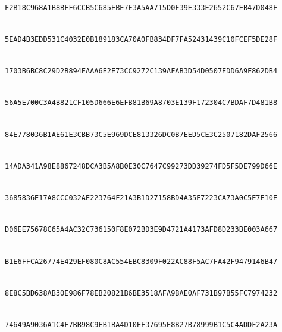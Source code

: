 \smallskip
\noindent{}\\
\nolinkurl{F2B18C968A1B8BFF6CCB5C685EBE7E3A5AA715D0F39E333E2652C67EB47D048F}\par
\smallskip
\noindent{}\\
\nolinkurl{5EAD4B3EDD531C4032E0B189183CA70A0FB834DF7FA52431439C10FCEF5DE28F}\par
\smallskip
\noindent{}\\
\nolinkurl{1703B6BC8C29D2B894FAAA6E2E73CC9272C139AFAB3D54D0507EDD6A9F862DB4}\par
\smallskip
\noindent{}\\
\nolinkurl{56A5E700C3A4B821CF105D666E6EFB81B69A8703E139F172304C7BDAF7D481B8}\par
\smallskip
\noindent{}\\
\nolinkurl{84E778036B1AE61E3CBB73C5E969DCE813326DC0B7EED5CE3C2507182DAF2566}\par
\smallskip
\noindent{}\\
\nolinkurl{14ADA341A98E8867248DCA3B5A8B0E30C7647C99273DD39274FD5F5DE799D66E}\par
\smallskip
\noindent{}\\
\nolinkurl{3685836E17A8CCC032AE223764F21A3B1D27158BD4A35E7223CA73A0C5E7E10E}\par
\smallskip
\noindent{}\\
\nolinkurl{D06EE75678C65A4AC32C736150F8E072BD3E9D4721A4173AFD8D233BE003A667}\par
\smallskip
\noindent{}\\
\nolinkurl{B1E6FFCA26774E429EF080C8AC554EBC8309F022AC88F5AC7FA42F9479146B47}\par
\smallskip
\noindent{}\\
\nolinkurl{8E8C5BD638AB30E986F78EB20821B6BE3518AFA9BAE0AF731B97B55FC7974232}\par
\smallskip
\noindent{}\\
\nolinkurl{74649A9036A1C4F7BB98C9EB1BA4D10EF37695E8B27B78999B1C5C4ADDF2A23A}\par
\smallskip
\noindent{}\\
